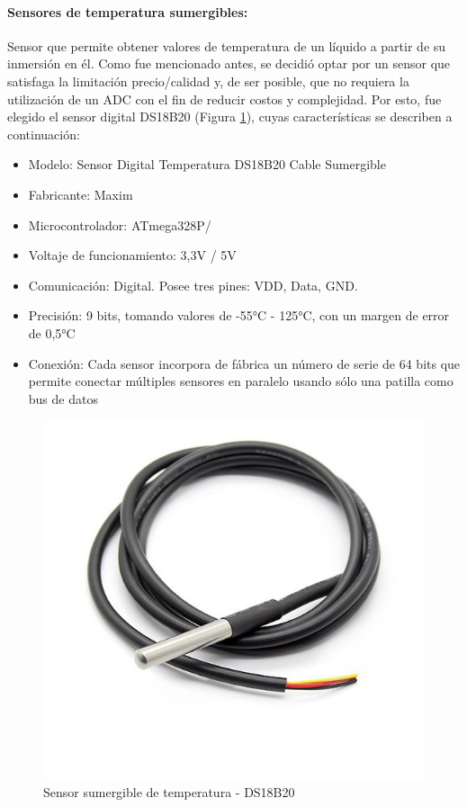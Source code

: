             \paragraph{Sensores de temperatura sumergibles:}Sensor que permite obtener valores de temperatura de un líquido a partir de su inmersión en él. Como fue mencionado antes, se decidió optar por un sensor que satisfaga la limitación precio/calidad y, de ser posible, que no requiera la utilización de un ADC con el fin de reducir costos y complejidad. Por esto, fue elegido el sensor digital DS18B20 (Figura \ref{SensorTemp}), cuyas características se describen a continuación:
            
                \begin{itemize}
                    \item Modelo: Sensor Digital Temperatura DS18B20 Cable Sumergible
                    \item Fabricante: Maxim
                    \item Microcontrolador: ATmega328P/
                    \item Voltaje de funcionamiento: 3,3V / 5V
                    \item Comunicación: Digital. Posee tres pines: VDD, Data, GND.
                    \item Precisión: 9 bits, tomando valores de -55°C - 125°C, con un margen de error de 0,5°C
                    \item Conexión: Cada sensor incorpora de fábrica un número de serie de 64 bits que permite conectar múltiples sensores en paralelo usando sólo una patilla como bus de datos
                \end{itemize}
                
                \begin{figure} [h]
                    \centering
                    \includegraphics[scale=0.35]{hardware/ds18b20.jpg}
                    \caption{Sensor sumergible de temperatura - DS18B20}
                    \label{SensorTemp}
                \end{figure}
                
